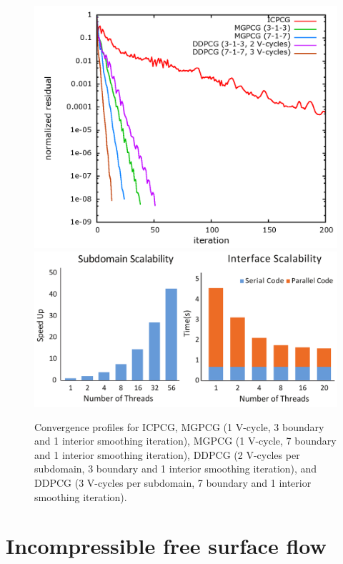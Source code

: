\begin{figure}[h]
\begin{center}
\includegraphics[width=0.48\columnwidth]{images/DD/convergence_plot.png}
\includegraphics[width=0.48\columnwidth]{images/DD/scalability.pdf}
\end{center}
\caption{
{ Convergence profiles for ICPCG, MGPCG (1 V-cycle, 3 boundary and 1 interior smoothing iteration), MGPCG (1 V-cycle, 7 boundary and 1 interior smoothing iteration), DDPCG (2
  V-cycles per subdomain, 3 boundary and 1 interior smoothing iteration), and DDPCG (3 V-cycles per subdomain, 7 boundary and 1 interior smoothing iteration).}
}
\label{fig:convergence-profiles}
\end{figure}


\section{Incompressible free surface flow}
\label{sec:free-surface}

